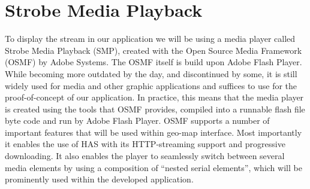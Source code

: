 \section{Strobe Media Playback}
\label{sec:smp}

To display the stream in our application we will be using a media player called Strobe Media Playback (SMP), created with the Open Source Media Framework (OSMF) by Adobe Systems. The OSMF itself is build upon Adobe Flash Player. While becoming more outdated by the day, and discontinued by some, it is still widely used for media and other graphic applications and suffices to use for the proof-of-concept of our application. In practice, this means that the media player is created using the tools that OSMF provides, compiled into a runnable flash file byte code and run by Adobe Flash Player. OSMF supports a number of important features that will be used within geo-map interface. Most importantly it enables the use of HAS with its HTTP-streaming support and progressive downloading. It also enables the player to seamlessly switch between several media elements by using a composition of “nested serial elements”, which will be prominently used within the developed application\cite{osmf}.

